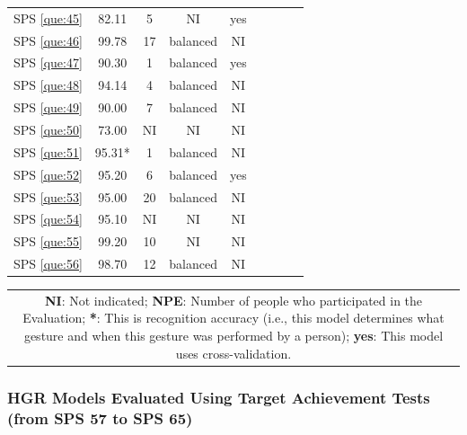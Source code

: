 \documentclass[sensors,review,accept,moreauthors,pdftex]{Definitions/mdpi}
\begin{document}
\begin{table}[H]
\begin{tabular}{ccccccccc}
	SPS \ref{que:45}	&	82.11	&	5	&	NI	&	yes	\\	
	SPS \ref{que:46}	&	99.78	&	17	&	balanced	&	NI	\\	
	SPS \ref{que:47}	&	90.30	&	1	&	balanced	&	yes	\\	
	SPS \ref{que:48}	&	94.14	&	4	&	balanced	&	NI	\\	
	SPS \ref{que:49}	&	90.00	&	7	&	balanced	&	NI	\\	
	SPS \ref{que:50}	&	73.00	&	NI	&	NI	&	NI	\\	
	SPS \ref{que:51}	&	95.31*	&	1	&	balanced	&	NI	\\	
	SPS \ref{que:52}	&	95.20	&	6	&	balanced	&	yes	\\	
	SPS \ref{que:53}	&	95.00	&	20	&	balanced	&	NI	\\	
	SPS \ref{que:54}	&	95.10	&	NI	&	NI	&	NI	\\	
	SPS \ref{que:55}	&	99.20	&	10	&	NI	&	NI	\\	
	SPS \ref{que:56}	&	98.70	&	12	&	balanced	&	NI	\\	
	\bottomrule
		\end{tabular}
		\begin{tabular}{@{}c@{}} 
\multicolumn{1}{p{\textwidth -.88in}}{\footnotesize \textbf{NI}: Not indicated; \textbf{NPE}: Number of people who participated in the Evaluation; \textbf{*}: This is recognition accuracy (i.e., this model determines what gesture and when this gesture was performed by a person); \textbf{yes}: This model uses cross-validation.}
\end{tabular}

\end{table}
	
%	
%	
%	
%

\subsubsection{HGR Models Evaluated Using Target Achievement Tests (from SPS 57 to SPS 65)}
\end{document}
